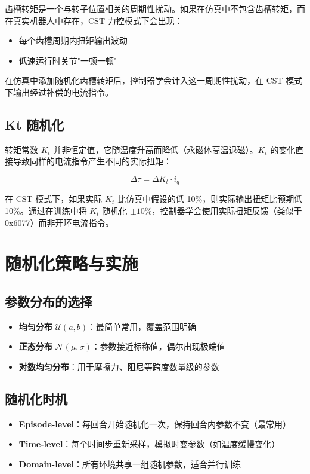 齿槽转矩是一个与转子位置相关的周期性扰动。如果在仿真中不包含齿槽转矩，而在真实机器人中存在，CST 力控模式下会出现：

\begin{itemize}
    \item 每个齿槽周期内扭矩输出波动
    \item 低速运行时关节"一顿一顿"
\end{itemize}

在仿真中添加随机化齿槽转矩后，控制器学会计入这一周期性扰动，在 CST 模式下输出经过补偿的电流指令。

\subsection{Kt 随机化}

转矩常数 \(K_t\) 并非恒定值，它随温度升高而降低（永磁体高温退磁）。\(K_t\) 的变化直接导致同样的电流指令产生不同的实际扭矩：

\begin{equation}
\Delta \tau = \Delta K_t \cdot i_q
\end{equation}

在 CST 模式下，如果实际 \(K_t\) 比仿真中假设的低 10\%，则实际输出扭矩比预期低 10\%。通过在训练中将 \(K_t\) 随机化 \(\pm 10\%\)，控制器学会使用实际扭矩反馈（类似于 0x6077）而非开环电流指令。

\section{随机化策略与实施}

\subsection{参数分布的选择}

\begin{itemize}
    \item \textbf{均匀分布} \(\mathcal{U}(a, b)\)：最简单常用，覆盖范围明确
    \item \textbf{正态分布} \(\mathcal{N}(\mu, \sigma)\)：参数接近标称值，偶尔出现极端值
    \item \textbf{对数均匀分布}：用于摩擦力、阻尼等跨度数量级的参数
\end{itemize}

\subsection{随机化时机}

\begin{itemize}
    \item \textbf{Episode-level}：每回合开始随机化一次，保持回合内参数不变（最常用）
    \item \textbf{Time-level}：每个时间步重新采样，模拟时变参数（如温度缓慢变化）
    \item \textbf{Domain-level}：所有环境共享一组随机参数，适合并行训练
\end{itemize}

